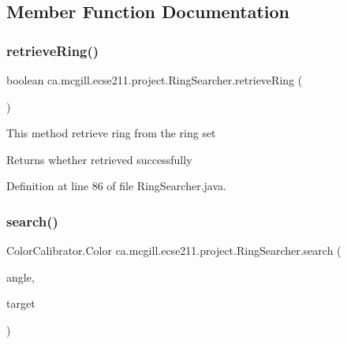 \subsection{Member Function Documentation}
\mbox{\label{classca_1_1mcgill_1_1ecse211_1_1project_1_1_ring_searcher_a988d23ece5820b5d60c3ef7079694958}} 
\subsubsection{\texorpdfstring{retrieve\+Ring()}{retrieveRing()}}
{\footnotesize\ttfamily boolean ca.\+mcgill.\+ecse211.\+project.\+Ring\+Searcher.\+retrieve\+Ring (\begin{DoxyParamCaption}{ }\end{DoxyParamCaption})}


\begin{DoxyItemize}
\item This method retrieve ring from the ring set \begin{DoxyReturn}{Returns}
whether retrieved successfully 
\end{DoxyReturn}

\end{DoxyItemize}

Definition at line 86 of file Ring\+Searcher.\+java.

\mbox{\label{classca_1_1mcgill_1_1ecse211_1_1project_1_1_ring_searcher_a86d4b320aa7e8368e38c5a38c030adb3}} 
\subsubsection{\texorpdfstring{search()}{search()}}
{\footnotesize\ttfamily Color\+Calibrator.\+Color ca.\+mcgill.\+ecse211.\+project.\+Ring\+Searcher.\+search (\begin{DoxyParamCaption}\item[{int}]{angle,  }\item[{Color\+Calibrator.\+Color}]{target }\end{DoxyParamCaption})}

